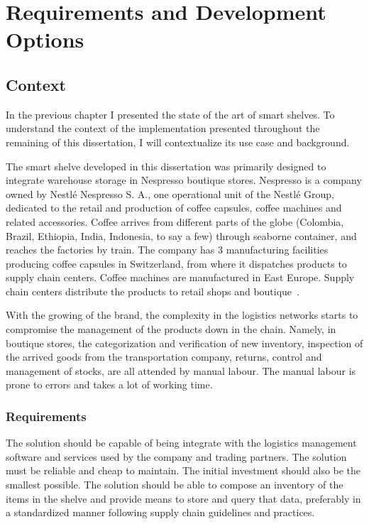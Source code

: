 \chapter{Requirements and Development Options}

\section{Context}

In the previous chapter I presented the state of the art of smart shelves. 
To understand the context of the implementation presented throughout the remaining of this dissertation, I will contextualize its use case and background.

The smart shelve developed in this dissertation was primarily designed to integrate warehouse storage in Nespresso boutique stores.
Nespresso is a company owned by Nestlé Nespresso S. A., one operational unit of the Nestlé Group, dedicated to the retail and production of coffee capsules, coffee machines and related accessories.
Coffee arrives from different parts of the globe (Colombia, Brazil, Ethiopia, India, Indonesia, to say a few) through seaborne container, and reaches the factories by train.
The company has 3 manufacturing facilities producing coffee capsules in Switzerland, from where it dispatches products to supply chain centers.
Coffee machines are manufactured in East Europe.
Supply chain centers distribute the products to retail shops and boutique~\cite{PortugalRecebeCentro}.

With  the  growing  of  the  brand,  the  complexity  in  the logistics networks starts to compromise the management of the products down in the chain.
Namely, in boutique stores, the categorization and verification of new inventory, inspection of the arrived goods from the transportation company,  returns,  control  and  management  of  stocks, are all attended by manual labour. The manual labour is prone to errors and takes a lot of working time.

\subsection{Requirements}

The solution should be capable of being integrate with the logistics management software and services used by the company and trading partners.
The solution must be reliable and cheap to maintain.
The initial investment should also be the smallest possible.
The solution should be able to compose an inventory of the items in the shelve and provide means to store and query that data, preferably in a standardized manner following supply chain guidelines and practices.

